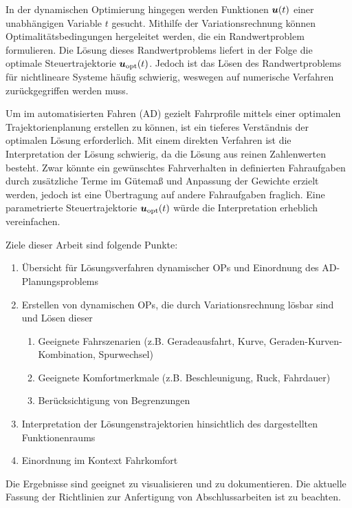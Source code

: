 In der dynamischen Optimierung hingegen werden Funktionen $\boldsymbol{u}(t)$ einer unabhängigen Variable $t$ gesucht. 
Mithilfe der Variationsrechnung können Optimalitätsbedingungen hergeleitet werden, die ein Randwertproblem formulieren. 
Die Lösung dieses Randwertproblems liefert in der Folge die optimale Steuertrajektorie $\boldsymbol{u}_\text{opt}(t)$. 
Jedoch ist das Lösen des Randwertproblems für nichtlineare Systeme häufig schwierig, weswegen auf numerische Verfahren zurückgegriffen werden muss.

Um im automatisierten Fahren (AD) gezielt Fahrprofile mittels einer optimalen Trajektorienplanung erstellen zu können, ist ein tieferes Verständnis der optimalen Lösung erforderlich. 
Mit einem direkten Verfahren ist die Interpretation der Lösung schwierig, da die Lösung aus reinen Zahlenwerten besteht. 
Zwar könnte ein gewünschtes Fahrverhalten in definierten Fahraufgaben durch zusätzliche Terme im Gütemaß und Anpassung der Gewichte erzielt werden, jedoch ist eine Übertragung auf andere Fahraufgaben fraglich. 
Eine parametrierte Steuertrajektorie $\boldsymbol{u}_\text{opt}(t)$ würde die Interpretation erheblich vereinfachen.


Ziele dieser Arbeit sind folgende Punkte:
\begin{enumerate}
	\item Übersicht für Lösungsverfahren dynamischer OPs und Einordnung des AD-Planungsproblems
	\item Erstellen von dynamischen OPs, die durch Variationsrechnung lösbar sind und Lösen dieser
	\begin{enumerate}
		\item Geeignete Fahrszenarien (z.B. Geradeausfahrt, Kurve, Geraden-Kurven-Kombination, Spurwechsel)
		\item Geeignete Komfortmerkmale (z.B. Beschleunigung, Ruck, Fahrdauer)
		\item Berücksichtigung von Begrenzungen
	\end{enumerate}
	\item Interpretation der Lösungenstrajektorien hinsichtlich des dargestellten Funktionenraums 
	\item Einordnung im Kontext Fahrkomfort
\end{enumerate}

Die Ergebnisse sind geeignet zu visualisieren und zu dokumentieren. Die aktuelle Fassung der Richtlinien zur Anfertigung von Abschlussarbeiten ist zu beachten.


%
%
%
